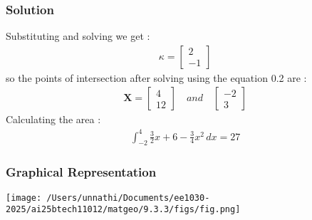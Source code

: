 \documentclass{beamer}
\begin{document}
\begin{frame}
\frametitle{Solution}
Substituting and solving we get :
\begin{align}
 \kappa = \begin{bmatrix}2 \\ -1\end{bmatrix}
\end{align}
so the points of intersection after solving using the equation 0.2 are :
\begin{align}
    \textbf{X} = \begin{bmatrix}4 \\ 12\end{bmatrix} \quad and \quad \begin{bmatrix}-2\\3\end{bmatrix}
\end{align}
Calculating the area  :
\begin{align}
    \int_{-2}^{4} \frac{3}{2}x + 6 - \frac{3}{4}x^2\,dx = 27 
\end{align}
\end{frame}


\begin{frame}

\frametitle{Graphical Representation}
\begin{center}
\texttt{[image: /Users/unnathi/Documents/ee1030-2025/ai25btech11012/matgeo/9.3.3/figs/fig.png]}
\end{center}
\end{frame}
\end{document}
